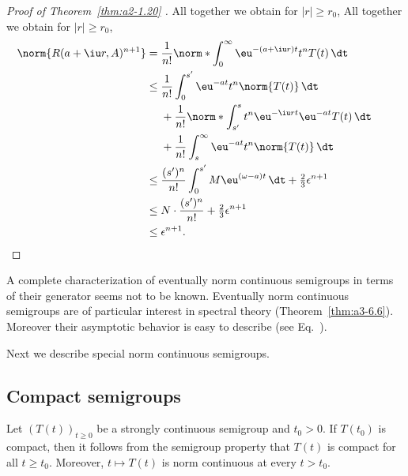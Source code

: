\begin{proof}[Proof of Theorem~\ref{thm:a2-1.20}  ]
All together we obtain for $|r| \geq r_{0}$,
All together we obtain for $\lvert r\rvert \geq r_{0}$,
\begin{align*}
  \norm{R(a + \iu r,A)^{n+1}}
    &= \frac{1}{n!}
       \norm*{\int_0^\infty \eu^{-(a + \iu r)t} t^n T(t)\,\dt} \\
    &\leq \frac{1}{n!}\int_{0}^{s'} \eu^{-at} t^n \norm{T(t)}\,\dt \\
    &\phantom{{}\leq{}}
       + \frac{1}{n!}
         \norm*{\int_{s'}^{s} t^n \eu^{-\iu rt} \eu^{-at} T(t)\,\dt} \\
    &\phantom{{}\leq{}}
       + \frac{1}{n!}\int_{s}^{\infty} \eu^{-at} t^n \norm{T(t)}\,\dt \\
    &\leq \frac{(s')^{n}}{n!}\int_{0}^{s'} M \eu^{(\omega - a)t}\,\dt
          + \tfrac{2}{3}\epsilon^{n+1} \\
    &\leq N \cdot \frac{(s')^n}{n!} + \tfrac{2}{3}\epsilon^{n+1} \\
   &\leq \epsilon^{n+1}. &&\qedhere
\end{align*}
\end{proof}
A complete characterization of eventually norm continuous semigroups in terms of their generator seems not to be known.
Eventually norm continuous semigroups are of particular interest in spectral theory (\cf Theorem~\ref{thm:a3-6.6}).
Moreover their asymptotic behavior is easy to describe (see Eq.~).

Next we describe special norm continuous semigroups.
\subsection{Compact semigroups} \label{subsec:a2-1.se7}%
Let $(T(t))_{t\geq 0}$ be a strongly continuous semigroup and $t_0 > 0$.
If\/ $T(t_0)$ is compact, then it follows from the semigroup property that $T(t)$ is compact for all $t \geq t_0$.
Moreover, $t \mapsto T(t)$ is norm continuous at every $t > t_0$.

